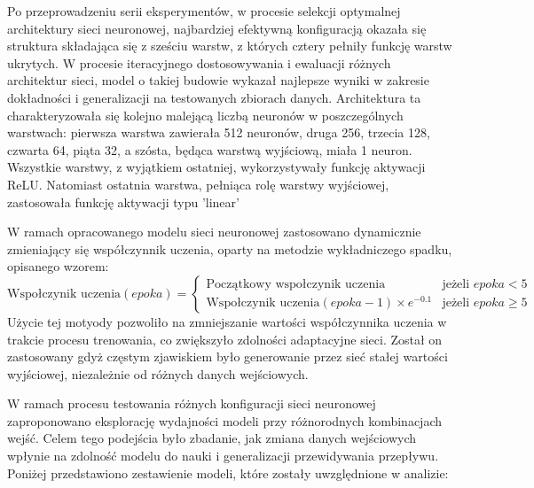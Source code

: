 \documentclass[a4paper,twoside,12pt]{book}
\begin{document}
Po przeprowadzeniu serii eksperymentów, w procesie selekcji optymalnej architektury sieci neuronowej, najbardziej efektywną konfiguracją okazała się struktura składająca się z sześciu warstw, z których cztery pełniły funkcję warstw ukrytych. W procesie iteracyjnego dostosowywania i ewaluacji różnych architektur sieci, model o takiej budowie wykazał najlepsze wyniki w zakresie dokładności i generalizacji na testowanych zbiorach danych. Architektura ta charakteryzowała się kolejno malejącą liczbą neuronów w poszczególnych warstwach: pierwsza warstwa zawierała 512 neuronów, druga 256, trzecia 128, czwarta 64, piąta 32, a szósta, będąca warstwą wyjściową, miała 1 neuron. Wszystkie warstwy, z wyjątkiem ostatniej, wykorzystywały funkcję aktywacji ReLU. Natomiast ostatnia warstwa, pełniąca rolę warstwy wyjściowej, zastosowała funkcję aktywacji typu 'linear'


W ramach opracowanego modelu sieci neuronowej zastosowano dynamicznie zmieniający się współczynnik uczenia, oparty na metodzie wykładniczego spadku, opisanego wzorem:
\begin{equation}
	\text{Wspołczynik uczenia}(epoka) =
	\begin{cases}
		\text{Początkowy wspołczynik uczenia}                 & \text{jeżeli } epoka < 5    \\
		\text{Wspołczynik uczenia}(epoka - 1) \times e^{-0.1} & \text{jeżeli } epoka \geq 5
	\end{cases}
\end{equation}
Użycie tej motyody pozwoliło na zmniejszanie wartości współczynnika uczenia w trakcie procesu trenowania, co zwiększyło zdolności adaptacyjne sieci. Został on zastosowany gdyż częstym zjawiskiem było generowanie przez sieć stałej wartości wyjściowej, niezależnie od różnych danych wejściowych.

W ramach procesu testowania różnych konfiguracji sieci neuronowej zaproponowano eksplorację wydajności modeli przy różnorodnych kombinacjach wejść. Celem tego podejścia było zbadanie, jak zmiana danych wejściowych wpłynie na zdolność modelu do nauki i generalizacji przewidywania przepływu. Poniżej przedstawiono zestawienie modeli, które zostały uwzględnione w analizie:
\end{document}
